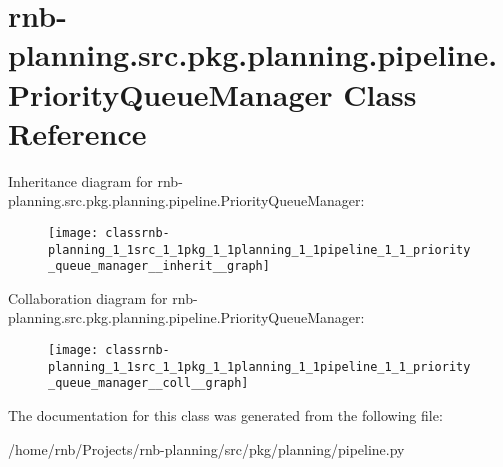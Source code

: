 \hypertarget{classrnb-planning_1_1src_1_1pkg_1_1planning_1_1pipeline_1_1_priority_queue_manager}{}\section{rnb-\/planning.src.\+pkg.\+planning.\+pipeline.\+Priority\+Queue\+Manager Class Reference}
\label{classrnb-planning_1_1src_1_1pkg_1_1planning_1_1pipeline_1_1_priority_queue_manager}


Inheritance diagram for rnb-\/planning.src.\+pkg.\+planning.\+pipeline.\+Priority\+Queue\+Manager\+:\nopagebreak
\begin{figure}[H]
\begin{center}
\leavevmode
\texttt{[image: classrnb-planning\_1\_1src\_1\_1pkg\_1\_1planning\_1\_1pipeline\_1\_1\_priority\_queue\_manager\_\_inherit\_\_graph]}
\end{center}
\end{figure}


Collaboration diagram for rnb-\/planning.src.\+pkg.\+planning.\+pipeline.\+Priority\+Queue\+Manager\+:\nopagebreak
\begin{figure}[H]
\begin{center}
\leavevmode
\texttt{[image: classrnb-planning\_1\_1src\_1\_1pkg\_1\_1planning\_1\_1pipeline\_1\_1\_priority\_queue\_manager\_\_coll\_\_graph]}
\end{center}
\end{figure}


The documentation for this class was generated from the following file\+:\begin{DoxyCompactItemize}
\item 
/home/rnb/\+Projects/rnb-\/planning/src/pkg/planning/pipeline.\+py\end{DoxyCompactItemize}
